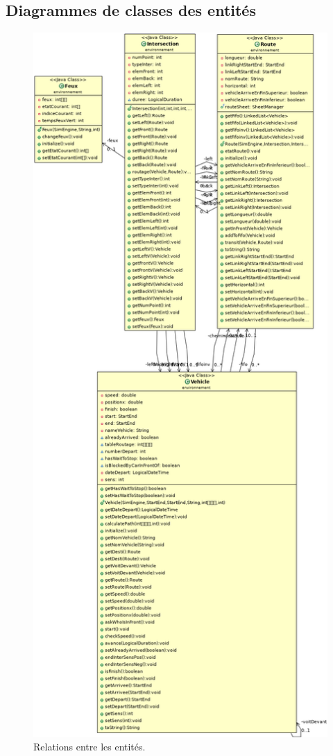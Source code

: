 \documentclass[12pt]{article} %
\begin{document}
\subsection{Diagrammes de classes des entités}
\begin{figure}[H]
	\centering
	\includegraphics[height=0.9\textheight]{UML_entites.png}
	\caption{Relations entre les entités.}
	\label{fig:UML_entites}
\end{figure}
\end{document}
